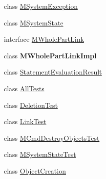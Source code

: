 \begin{DoxyCompactItemize}
\item 
class \hyperlink{classorg_1_1tzi_1_1use_1_1uml_1_1sys_1_1_m_system_exception}{M\-System\-Exception}
\item 
class \hyperlink{classorg_1_1tzi_1_1use_1_1uml_1_1sys_1_1_m_system_state}{M\-System\-State}
\item 
interface \hyperlink{interfaceorg_1_1tzi_1_1use_1_1uml_1_1sys_1_1_m_whole_part_link}{M\-Whole\-Part\-Link}
\item 
class {\bfseries M\-Whole\-Part\-Link\-Impl}
\item 
class \hyperlink{classorg_1_1tzi_1_1use_1_1uml_1_1sys_1_1_statement_evaluation_result}{Statement\-Evaluation\-Result}
\item 
class \hyperlink{classorg_1_1tzi_1_1use_1_1uml_1_1sys_1_1_all_tests}{All\-Tests}
\item 
class \hyperlink{classorg_1_1tzi_1_1use_1_1uml_1_1sys_1_1_deletion_test}{Deletion\-Test}
\item 
class \hyperlink{classorg_1_1tzi_1_1use_1_1uml_1_1sys_1_1_link_test}{Link\-Test}
\item 
class \hyperlink{classorg_1_1tzi_1_1use_1_1uml_1_1sys_1_1_m_cmd_destroy_objects_test}{M\-Cmd\-Destroy\-Objects\-Test}
\item 
class \hyperlink{classorg_1_1tzi_1_1use_1_1uml_1_1sys_1_1_m_system_state_test}{M\-System\-State\-Test}
\item 
class \hyperlink{classorg_1_1tzi_1_1use_1_1uml_1_1sys_1_1_object_creation}{Object\-Creation}
\end{DoxyCompactItemize}
